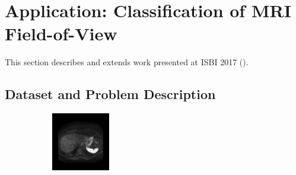 \section{Application: Classification of MRI Field-of-View}

This section describes and extends work presented at ISBI 2017 (\textcite{bertrand2017ISBI}).

\subsection{Dataset and Problem Description}

\begin{figure}
        \begin{subfigure}[b]{0.25\textwidth}
                \centering
                \includegraphics[width=.95\linewidth]{img_hyperopt/Abdomen_785}
        \end{subfigure}%
        \begin{subfigure}[b]{0.25\textwidth}
                \centering

\end{subfigure}
\end{figure}
